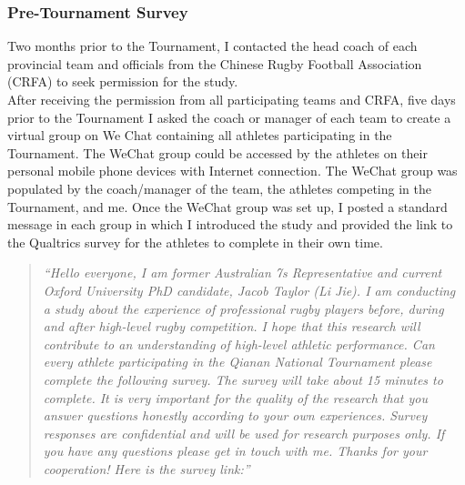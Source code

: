 \documentclass[12pt]{report}
\begin{document}
  \subsubsection{Pre-Tournament Survey}
Two months prior to the Tournament, I contacted the head coach of each provincial team and officials from the Chinese Rugby Football Association (CRFA) to seek permission for the study. \\

After receiving the permission from all participating teams and CRFA, five days prior to the Tournament I asked the coach or manager of each team to create a virtual group on We Chat containing all athletes participating in the Tournament. The WeChat group could be accessed by the athletes on their personal mobile phone devices with Internet connection. The WeChat group was populated by the coach/manager of the team, the athletes competing in the Tournament, and me. Once the WeChat group was set up, I posted a standard message in each group in which I introduced the study and provided the link to the Qualtrics survey for the athletes to complete in their own time.\\


\begin{quotation}
      \textit{``Hello everyone, I am former Australian 7s Representative and current Oxford University PhD candidate, Jacob Taylor (Li Jie). I am conducting a study about the experience of professional rugby players before, during and after high-level rugby competition. I hope that this research will contribute to an understanding of high-level athletic performance. Can every athlete participating in the Qianan National Tournament please complete the following survey. The survey will take about 15 minutes to complete. It is very important for the quality of the research that you answer questions honestly according to your own experiences. Survey responses are confidential and will be used for research purposes only. If you have any questions please get in touch with me. Thanks for your cooperation! Here is the survey link:''}
\end{quotation}\\
\bigskip
\end{document}
